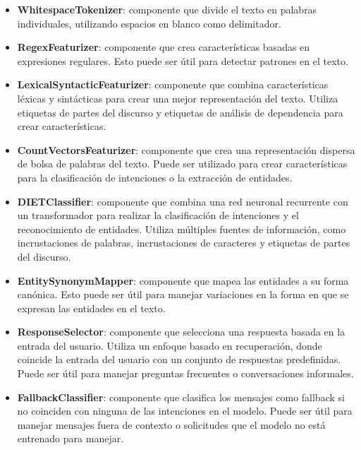 \begin{itemize}
	\item \textbf{WhitespaceTokenizer}: componente que divide el texto en palabras
	      individuales, utilizando espacios en blanco como delimitador.
	      \cite{Configuration_Documentation}
	\item \textbf{RegexFeaturizer}: componente que crea características basadas en expresiones
	      regulares. Esto puede ser útil para detectar patrones en el texto.
	      \cite{Configuration_Documentation}
	\item \textbf{LexicalSyntacticFeaturizer}: componente que combina características léxicas y
	      sintácticas para crear una mejor representación del texto. Utiliza etiquetas de
	      partes del discurso
	      y etiquetas de análisis de dependencia para crear características.
	      \cite{Configuration_Documentation}
	\item \textbf{CountVectorsFeaturizer}: componente que crea una representación dispersa de
	      bolsa de
	      palabras del texto. Puede ser utilizado para crear características para la
	      clasificación de
	      intenciones o la extracción de entidades. \cite{Configuration_Documentation}
	\item \textbf{DIETClassifier}: componente que combina una red neuronal recurrente con un
	      transformador para realizar la clasificación de intenciones y el reconocimiento de
	      entidades.
	      Utiliza múltiples fuentes de información, como incrustaciones de palabras,
	      incrustaciones de
	      caracteres y etiquetas de partes del discurso. \cite{Configuration_Documentation}
	\item \textbf{EntitySynonymMapper}: componente que mapea las entidades a su forma canónica.
	      Esto
	      puede ser útil para manejar variaciones en la forma en que se expresan las entidades
	      en el texto. \cite{Configuration_Documentation}
	\item \textbf{ResponseSelector}: componente que selecciona una respuesta basada en la
	      entrada del
	      usuario. Utiliza un enfoque basado en recuperación, donde coincide la entrada del
	      usuario con un
	      conjunto de respuestas predefinidas. Puede ser útil para manejar preguntas frecuentes
	      o
	      conversaciones informales.\cite{Configuration_Documentation}
	\item \textbf{FallbackClassifier}: componente que clasifica los mensajes como fallback si
	      no
	      coinciden con ninguna de las intenciones en el modelo. Puede ser útil para manejar
	      mensajes fuera
	      de contexto o solicitudes que el modelo no está entrenado para
	      manejar.\cite{Configuration_Documentation}
\end{itemize}
